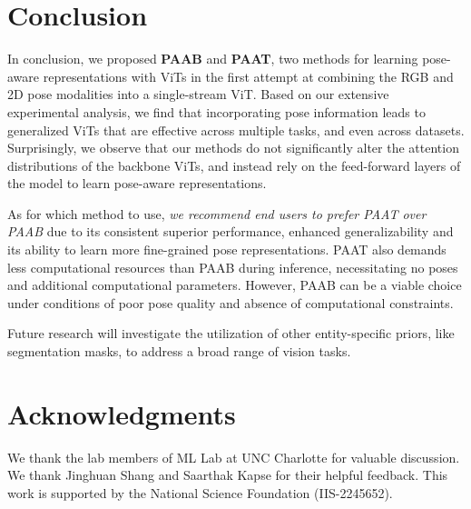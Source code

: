 \documentclass{article}
\begin{document}
\vspace{-0.05in}
\section{Conclusion}
\vspace{-0.05in}




In conclusion, we proposed \textbf{PAAB} and \textbf{PAAT}, two methods for learning pose-aware representations with ViTs in the first attempt at combining the RGB and 2D pose modalities into a single-stream ViT. 
Based on our extensive experimental analysis, we find that incorporating pose information leads to generalized ViTs that are effective across multiple tasks, and even across datasets. Surprisingly, we observe that our methods do not significantly alter the attention distributions of the backbone ViTs, and instead rely on the feed-forward layers of the model to learn pose-aware representations. 

As for which method to use, \textit{we recommend end users to prefer PAAT over PAAB} due to its consistent superior performance, enhanced generalizability and its ability to learn more fine-grained pose representations. PAAT also demands less computational resources than PAAB during inference, necessitating no poses and additional computational parameters. However, PAAB can be a viable choice under conditions of poor pose quality and absence of computational constraints.



Future research will investigate the utilization of other entity-specific priors, like segmentation masks, to address a broad range of vision tasks.




















\section*{Acknowledgments}
We thank the lab members of ML Lab at UNC Charlotte for valuable discussion. 
We thank Jinghuan Shang and Saarthak Kapse for their helpful feedback.
This work is supported by the National Science Foundation (IIS-2245652). 
\end{document}
